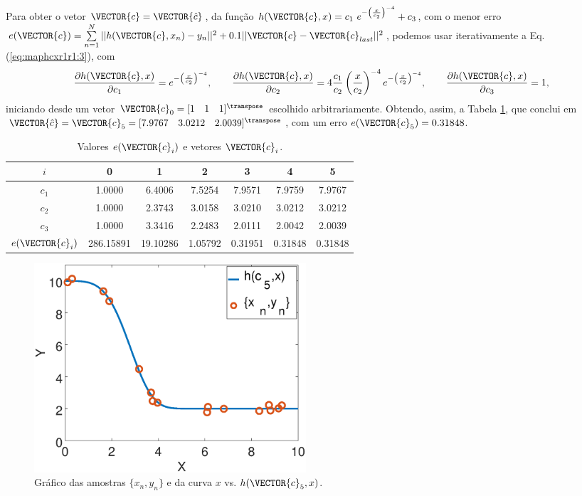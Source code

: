 \begin{SolutionT}\label{sol:theo:maphcxr1r1}
Para obter  o vetor $\VECTOR{c}=\VECTOR{\hat{c}}$, da função $h(\VECTOR{c},x) = c_1~ e^{-\left(\frac{x}{c_2}\right)^{-4}}+c_3$,
com o menor erro $e(\VECTOR{c})=\sum\limits_{n=1}^{N} ||h(\VECTOR{c},x_n)-y_n||^2 +0.1 ||\VECTOR{c}-\VECTOR{c}_{last}||^2$,
podemos usar iterativamente a Eq. (\ref{eq:maphcxr1r1:3}), com 
\begin{equation}
\frac{\partial h(\VECTOR{c},x)}{\partial c_1} 
= e^{-\left(\frac{x}{c_2}\right)^{-4}},\qquad 
\frac{\partial h(\VECTOR{c},x)}{\partial c_2} 
= 4\frac{c_1}{c_2}\left(\frac{x}{c_2}\right)^{-4}e^{-\left(\frac{x}{c_2}\right)^{-4}}, \qquad 
\frac{\partial h(\VECTOR{c},x)}{\partial c_3} 
=1,
\end{equation} 
iniciando desde um vetor $\VECTOR{c}_{0}=[1\quad 1\quad 1]^{\transpose}$ escolhido arbitrariamente.
Obtendo, assim, a Tabela \ref{table:theo:maphcxr1r1:ei}, que conclui em
$\VECTOR{\hat{c}}=\VECTOR{c}_{5}=[7.9767\quad 3.0212\quad 2.0039]^{\transpose}$,
com  um erro $e(\VECTOR{c}_{5})=0.31848$.


\begin{table}[h!]
\centering
\begin{tabular}{|c|c|c|c|c|c|c|} 
 \hline
$i$   & 0 & 1 & 2 & 3 & 4 & 5 \\ \hline
\hline
$c_1$ & 1.0000 & 6.4006 & 7.5254 & 7.9571 & 7.9759 & 7.9767 \\ \hline
$c_2$ & 1.0000 & 2.3743 & 3.0158 & 3.0210 & 3.0212 & 3.0212 \\ \hline
$c_3$ & 1.0000 & 3.3416 & 2.2483 & 2.0111 & 2.0042 & 2.0039 \\ \hline
\hline
$e(\VECTOR{c}_{i})$ & 286.15891 & 19.10286 & 1.05792 & 0.31951 & 0.31848 & 0.31848  \\ \hline
\end{tabular}
\caption{Valores $e(\VECTOR{c}_{i})$ e vetores $\VECTOR{c}_{i}$.}
\label{table:theo:maphcxr1r1:ei}
\end{table}

    \begin{figure}[!h]
        \centering
        \includegraphics[width=0.49\textwidth]{chapters/mapeamento/mfiles/mapeamentor1r1-nonlinear/minimizando_hx.eps}
        \caption{Gráfico das amostras $\{x_n,y_n\}$ e da curva $x$ vs. $h(\VECTOR{c}_5,x)$.}
        \label{fig:theo:maphcxr1r1:xnyn}
    \end{figure}

\end{SolutionT}


